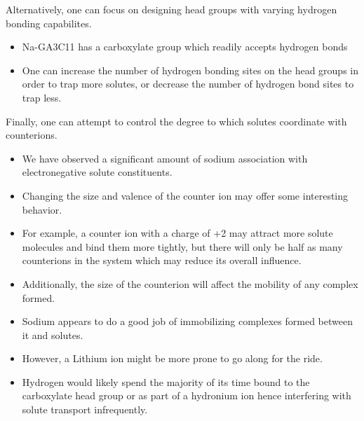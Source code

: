 \documentclass{article}
\begin{document}
  Alternatively, one can focus on designing head groups with varying hydrogen 
  bonding capabilites.
  \begin{itemize}
    \item Na-GA3C11 has a carboxylate group which readily accepts hydrogen bonds
    \item One can increase the number of hydrogen bonding sites on the head groups
    in order to trap more solutes, or decrease the number of hydrogen bond sites
    to trap less.
  \end{itemize}
  
  Finally, one can attempt to control the degree to which solutes coordinate 
  with counterions.
  \begin{itemize}
    \item We have observed a significant amount of sodium association with 
    electronegative solute constituents.
    \item Changing the size and valence of the counter ion may offer some
    interesting behavior. 
    \item For example, a counter ion with a charge of +2 may attract more solute
    molecules and bind them more tightly, but there will only be half as many
    counterions in the system which may reduce its overall influence.
    \item Additionally, the size of the counterion will affect the mobility
    of any complex formed. 
    \item Sodium appears to do a good job of immobilizing complexes formed between
    it and solutes. 
    \item However, a Lithium ion might be more prone to go along for the ride.
    \item Hydrogen would likely spend the majority of its time bound to the 
    carboxylate head group or as part of a hydronium ion hence interfering with 
    solute transport infrequently.
  \end{itemize}
  
\end{document}
